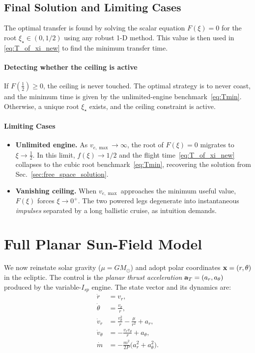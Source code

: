 \documentclass[journal, a4paper]{IEEEtran}
\begin{document}
\subsection{Final Solution and Limiting Cases}
The optimal transfer is found by solving the scalar equation $F(\xi)=0$ for the root $\xi_\star \in (0, 1/2)$ using any robust 1-D method. This value is then used in \eqref{eq:T_of_xi_new} to find the minimum transfer time.

\paragraph*{Detecting whether the ceiling is active}
If $F(\tfrac12)\ge0$, the ceiling is never touched. The optimal strategy is to never coast, and the minimum time is given by the unlimited-engine benchmark~\eqref{eq:Tmin}. Otherwise, a unique root $\xi_\star$ exists, and the ceiling constraint is active.

\paragraph*{Limiting Cases}
\begin{itemize}
\item \textbf{Unlimited engine.} As $v_{e,\max}\!\to\!\infty$, the root of $F(\xi)=0$ migrates to $\xi\!\to\!\tfrac12$. In this limit, $f(\xi)\to 1/2$ and the flight time~\eqref{eq:T_of_xi_new} collapses to the cubic root benchmark~\eqref{eq:Tmin}, recovering the solution from Sec.~\ref{sec:free_space_solution}.
\item \textbf{Vanishing ceiling.} When $v_{e,\max}$ approaches the minimum useful value, $F(\xi)$ forces $\xi\!\to\!0^{+}$. The two powered legs degenerate into instantaneous \emph{impulses} separated by a long ballistic cruise, as intuition demands.
\end{itemize}

\section{Full Planar Sun-Field Model}
\label{sec:SunModel}
We now reinstate solar gravity ($\mu=GM_\odot$) and adopt polar coordinates ${\bf x}=(r,\theta)$ in the ecliptic. The control is the \emph{planar thrust acceleration} ${\bf a}_{T}=(a_r,a_\theta)$ produced by the variable-$I_{\!sp}$ engine. The state vector and its dynamics are:
\begin{subequations}\label{eq:StateDyn}
\begin{align}
  \dot r       &= v_r, \\
  \dot\theta   &= \frac{v_\theta}{r}, \\
  \dot v_r     &= \frac{v_\theta^{2}}{r}-\frac{\mu}{r^{2}} + a_r, \\
  \dot v_\theta&= -\frac{v_r v_\theta}{r} + a_\theta, \\
  \dot m       &= -\frac{m^{2}}{2P}\bigl(a_r^{2}+a_\theta^{2}\bigr).
\end{align}
\end{subequations}
\end{document}
